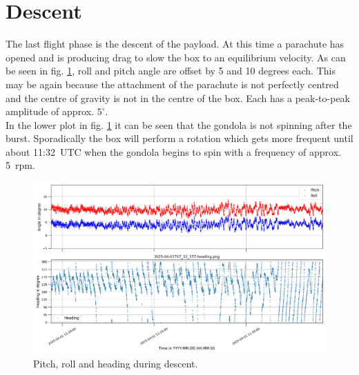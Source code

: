 \section{Descent \label{sec:descent}}
The last flight phase is the descent of the payload. At this time a parachute has opened and is producing drag to slow the box to an equilibrium velocity. As can be seen in fig. \ref{fig:res:descent_heading}, roll and pitch angle are offset by 5 and 10 degrees each. This may be again because the attachment of the parachute is not perfectly centred and the centre of gravity is not in the centre of the box. Each has a peak-to-peak amplitude of approx. $5^\circ$.\\
In the lower plot in fig. \ref{fig:res:descent_heading} it can be seen that the gondola is not spinning after the burst. Sporadically the box will perform a rotation which gets more frequent until about 11:32~UTC when the gondola begins to spin with a frequency of approx. 5~rpm.

\begin{figure}[H]
    \centering
    \includegraphics[width=\linewidth]{images/04_results/descend_heading.png}
    \caption[Heading during descent.]{Pitch, roll and heading during descent.}
    \label{fig:res:descent_heading}
\end{figure}
